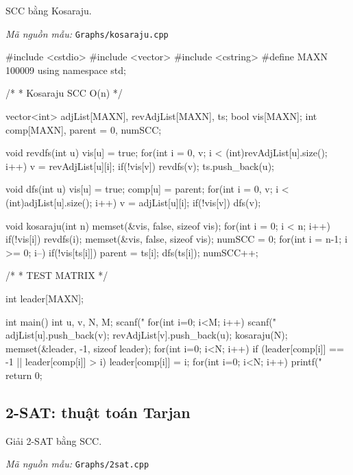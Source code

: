 \documentclass[11pt]{article}
\newcommand{\codepath}[1]{\par\noindent\textit{Mã nguồn mẫu:} \texttt{#1}\par}
\begin{document}
SCC bằng Kosaraju.

\codepath{Graphs/kosaraju.cpp}

\begingroup\scriptsize
\begin{vncode}
#include <cstdio>
#include <vector>
#include <cstring>
#define MAXN 100009
using namespace std;

/*
 * Kosaraju SCC O(n)
 */

vector<int> adjList[MAXN], revAdjList[MAXN], ts;
bool vis[MAXN];
int comp[MAXN], parent = 0, numSCC;

void revdfs(int u) {
    vis[u] = true;
    for(int i = 0, v; i < (int)revAdjList[u].size(); i++) {
    	v = revAdjList[u][i];
        if(!vis[v]) revdfs(v);
    }
    ts.push_back(u);
}

void dfs(int u) {
    vis[u] = true; comp[u] = parent;
    for(int i = 0, v; i < (int)adjList[u].size(); i++) {
    	v = adjList[u][i];
        if(!vis[v]) dfs(v);
    }
}

void kosaraju(int n) {
	memset(&vis, false, sizeof vis);
    for(int i = 0; i < n; i++)  {
        if(!vis[i]) revdfs(i);
    }
    memset(&vis, false, sizeof vis);
    numSCC = 0;
    for(int i = n-1; i >= 0; i--) {
        if(!vis[ts[i]]) {
            parent = ts[i];
            dfs(ts[i]);
            numSCC++;
        }
    }
}

/*
 * TEST MATRIX
 */

int leader[MAXN];

int main() {
    int u, v, N, M;
	scanf("%
	for(int i=0; i<M; i++) {
		scanf("%
		adjList[u].push_back(v);
		revAdjList[v].push_back(u);
	}
    kosaraju(N);
    memset(&leader, -1, sizeof leader);
	for(int i=0; i<N; i++) {
		if (leader[comp[i]] == -1 || leader[comp[i]] > i) {
			leader[comp[i]] = i;
		}
	}
	for(int i=0; i<N; i++) printf("%
    return 0;
}
\end{vncode}
\endgroup


\subsection{2-SAT: thuật toán Tarjan}

Giải 2-SAT bằng SCC.

\codepath{Graphs/2sat.cpp}
\end{document}
